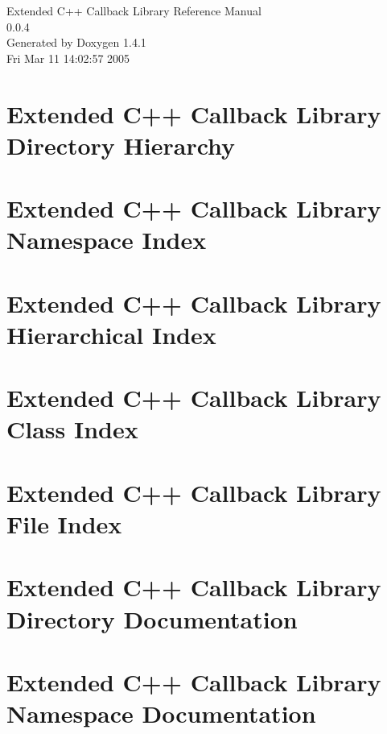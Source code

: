 \documentclass[a4paper]{book}
\begin{document}
\begin{titlepage}
\vspace*{7cm}
\begin{center}
{\Large Extended C++ Callback Library Reference Manual\\[1ex]\large 0.0.4 }\\
\vspace*{1cm}
{\large Generated by Doxygen 1.4.1}\\
\vspace*{0.5cm}
{\small Fri Mar 11 14:02:57 2005}\\
\end{center}
\end{titlepage}
\clearemptydoublepage
{}
\tableofcontents
\clearemptydoublepage
{}
\chapter{Extended C++ Callback Library Directory Hierarchy}

\chapter{Extended C++ Callback Library Namespace Index}

\chapter{Extended C++ Callback Library Hierarchical Index}

\chapter{Extended C++ Callback Library Class Index}

\chapter{Extended C++ Callback Library File Index}

\chapter{Extended C++ Callback Library Directory Documentation}






\chapter{Extended C++ Callback Library Namespace Documentation}


\end{document}
